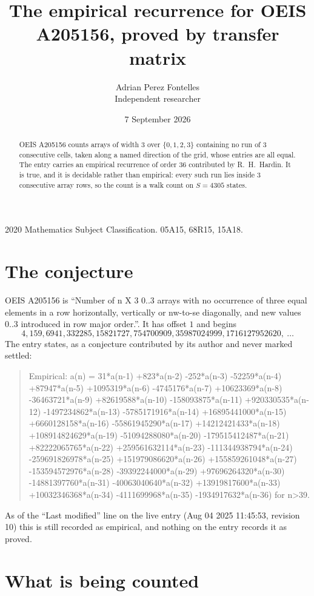 \documentclass[11pt,a4paper]{article}
\title{The empirical recurrence for OEIS A205156, proved by transfer matrix}
\author{Adrian Perez Fontelles\\ \small Independent researcher}
\date{7 September 2026}
\theoremstyle{plain}
\theoremstyle{definition}
\begin{document}
\maketitle

\begin{abstract}
OEIS A205156 counts arrays of width $3$ over $\{0,1,2,3\}$ containing no run of $3$ consecutive
cells, taken along a named direction of the grid, whose entries are all equal. The entry carries
an empirical recurrence of order $36$ contributed by R.~H.~Hardin. It is true, and it is
decidable rather than empirical: every such run lies inside $3$ consecutive array rows, so
the count is a walk count on $S=4305$ states.
\end{abstract}

\noindent\small 2020 Mathematics Subject Classification. 05A15, 68R15, 15A18.\normalsize

\section{The conjecture}

OEIS A205156 is ``Number of n X 3 0..3 arrays with no occurrence of three equal elements in a row horizontally, vertically or nw-to-se diagonally, and new values 0..3 introduced in row major order.''. It has offset $1$ and begins
\[
4, 159, 6941, 332285, 15821727, 754700909, 35987024999, 1716127952620,\ \dots
\]
The entry states, as a conjecture contributed by its author and never marked settled:
\begin{quote}
Empirical: a(n) = 31*a(n-1) +823*a(n-2) -252*a(n-3) -52259*a(n-4) +87947*a(n-5) +1095319*a(n-6) -4745176*a(n-7) +10623369*a(n-8) -36463721*a(n-9) +82619588*a(n-10) -158093875*a(n-11) +920330535*a(n-12) -1497234862*a(n-13) -5785171916*a(n-14) +16895441000*a(n-15) +6660128158*a(n-16) -55861945290*a(n-17) +14212421433*a(n-18) +108914824629*a(n-19) -51094288080*a(n-20) -179515412487*a(n-21) +82222065765*a(n-22) +259561632114*a(n-23) -111344938794*a(n-24) -259691826978*a(n-25) +151979086620*a(n-26) +155859261048*a(n-27) -153594572976*a(n-28) -39392244000*a(n-29) +97696264320*a(n-30) -14881397760*a(n-31) -40063040640*a(n-32) +13919817600*a(n-33) +10032346368*a(n-34) -4111699968*a(n-35) -1934917632*a(n-36) for n>39.
\end{quote}
As of the ``Last modified'' line on the live entry (Aug 04 2025 11:45:53, revision 10) this is still
recorded as empirical, and nothing on the entry records it as proved.

\section{What is being counted}
\end{document}
